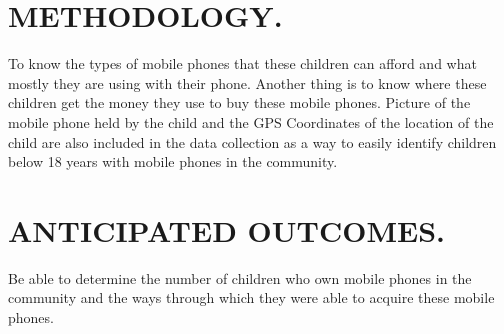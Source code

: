 \documentclass {article}
\begin{document}
\section{METHODOLOGY. }
To know the types of mobile phones that these children can afford and what mostly they are using with their phone. Another thing is to know where these children get the money they use to buy these mobile phones. Picture of the mobile phone held by the child and the GPS Coordinates of the location of the child are also included in the data collection as a way to easily identify children below 18 years with mobile phones in the community.
\section {ANTICIPATED OUTCOMES.}
Be able to determine the number of children who own mobile phones in the community and the ways through which they were able to acquire these mobile phones.
\end{document}
